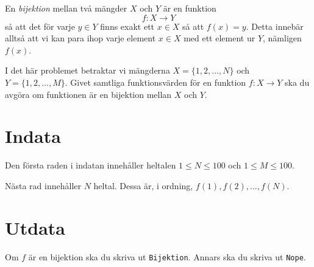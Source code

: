 
En \emph{bijektion} mellan två mängder $X$ och $Y$ är en funktion $$f : X \rightarrow Y$$ så att det för varje $y \in Y$ finns exakt ett $x \in X$ så att $f(x) = y$. Detta innebär alltså att vi kan para ihop varje element $x \in X$ med ett element ur $Y$, nämligen $f(x)$.

I det här problemet betraktar vi mängderna $X = \{1, 2, ..., N\}$ och $Y = \{1, 2, ..., M\}$. Givet samtliga funktionsvärden för en funktion $f : X \rightarrow Y$ ska du avgöra om funktionen är en bijektion mellan $X$ och $Y$.

\section*{Indata}
Den första raden i indatan innehåller heltalen $1 \le N \le 100$ och $1 \le M \le 100$.

Nästa rad innehåller $N$ heltal. Dessa är, i ordning, $f(1), f(2), ..., f(N)$.

\section*{Utdata}
Om $f$ är en bijektion ska du skriva ut \texttt{Bijektion}. Annars ska du skriva ut \texttt{Nope}.
